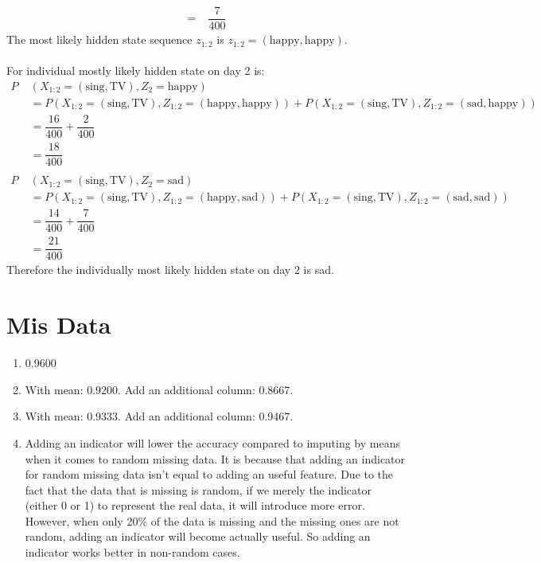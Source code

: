 \documentclass[english]{article}
\begin{document}
\begin{enumerate}
\begin{align*}
    = &\; \dfrac{7}{400}
    \end{align*}
    The most likely hidden state sequence $z_{1:2}$ is $z_{1:2}=(\text{happy},\text{happy})$. \\\\For individual mostly likely hidden state on day 2 is:
    \begin{align*}
    P&\;(X_{1:2} = (\text{sing}, \text{TV}), Z_2 = \text{happy})\\
    &\; = P(X_{1:2} = (\text{sing}, \text{TV}), Z_{1:2} = (\text{happy}, \text{happy})) + P(X_{1:2} = (\text{sing}, \text{TV}), Z_{1:2} = (\text{sad}, \text{happy}))\\
    &\; = \dfrac{16}{400} + \dfrac{2}{400}\\
    &\; = \dfrac{18}{400}\\\\
    P&\;(X_{1:2} = (\text{sing}, \text{TV}), Z_2 = \text{sad})\\
    &\; = P(X_{1:2} = (\text{sing}, \text{TV}), Z_{1:2} = (\text{happy}, \text{sad})) + P(X_{1:2} = (\text{sing}, \text{TV}), Z_{1:2} = (\text{sad}, \text{sad}))\\
    &\; = \dfrac{14}{400} + \dfrac{7}{400}\\
    &\; = \dfrac{21}{400}
    \end{align*}
    Therefore the individually most likely hidden state on day 2 is sad.
\end{enumerate}
\clearpage
\section{Mis Data}
\begin{enumerate}
    \item 0.9600
    \item With mean: 0.9200. Add an additional column: 0.8667.
    \item With mean: 0.9333. Add an additional column: 0.9467.
    \item Adding an indicator will lower the accuracy compared to imputing by means when it comes to random missing data. It is because that adding an indicator for random missing data isn't equal to adding an useful feature. Due to the fact that the data that is missing is random, if we merely the indicator (either 0 or 1) to represent the real data, it will introduce more error. However, when only 20\% of the data is missing and the missing ones are not random, adding an indicator will become actually useful. So adding an indicator works better in non-random cases.
\end{enumerate}
\clearpage
\end{document}
